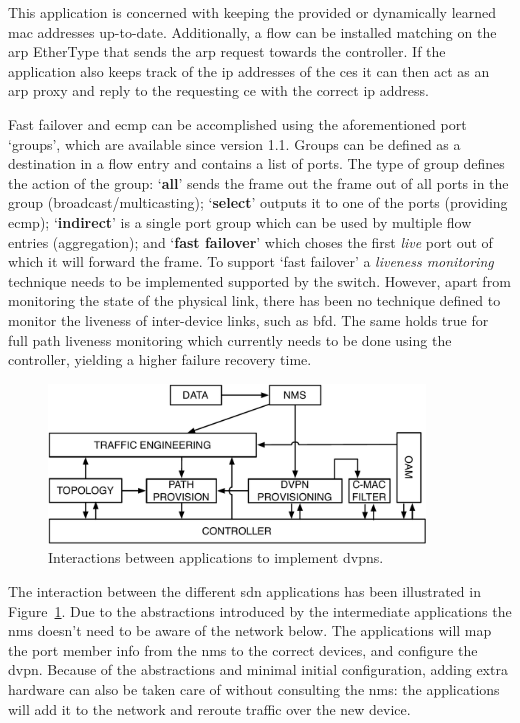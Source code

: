 \begin{description}[leftmargin=!,labelwidth=\widthof{\bfseries Topology Discovery}]
	\item[\ac{cmac} Filtering] This application is concerned with keeping the provided or dynamically learned \ac{mac} addresses up-to-date. Additionally, a flow can be installed matching on the \ac{arp} EtherType that sends the \ac{arp} request towards the controller. If the application also keeps track of the \ac{ip} addresses of the \acp{ce} it can then act as an \ac{arp} proxy and reply to the requesting \ac{ce} with the correct \ac{ip} address.
\end{description}

Fast failover and \ac{ecmp} can be accomplished using the aforementioned port `groups', which are available since version 1.1. Groups can be defined as a destination in a flow entry and contains a list of ports. The type of group defines the action of the group: `\textbf{all}' sends the frame out the frame out of all ports in the group (broadcast/multicasting); `\textbf{select}' outputs it to one of the ports (providing \ac{ecmp}); `\textbf{indirect}' is a single port group which can be used by multiple flow entries (aggregation); and `\textbf{fast failover}' which choses the first \textsl{live} port out of which it will forward the frame. To support `fast failover' a \textsl{liveness monitoring} technique needs to be implemented supported by the switch. However, apart from monitoring the state of the physical link, there has been no technique defined to monitor the liveness of inter-device links, such as \ac{bfd}. The same holds true for full path liveness monitoring which currently needs to be done using the controller, yielding a higher failure recovery time.

\begin{figure}[h]
	\centering
	\includegraphics[width=10cm]{./includes/dvpn-apps.pdf}
	\caption{Interactions between applications to implement \acp{dvpn}.}
	\label{fig:dvpn-apps}
\end{figure}


The interaction between the different \ac{sdn} applications has been illustrated in Figure~\ref{fig:dvpn-apps}. Due to the abstractions introduced by the intermediate applications the \ac{nms} doesn't need to be aware of the network below. The applications will map the port member info from the \ac{nms} to the correct devices, and configure the \ac{dvpn}. Because of the abstractions and minimal initial configuration, adding extra hardware can also be taken care of without consulting the \ac{nms}: the applications will add it to the network and reroute traffic over the new device.






